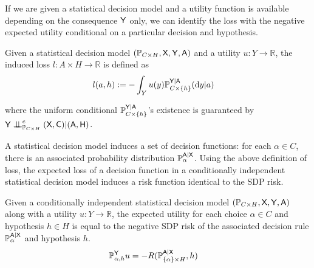 If we are given a statistical decision model and a utility function is available depending on the consequence $\mathsf{Y}$ only, we can identify the loss with the negative expected utility conditional on a particular decision and hypothesis.
\begin{definition}
Given a statistical decision model $(\mathbb{P}_{C\times H}, \mathsf{X},\mathsf{Y},\mathsf{A})$ and a utility $u:Y\to \mathbb{R}$, the induced loss $l:A\times H\to \mathbb{R}$ is defined as
\begin{align}
    l(a,h)&:= -\int_Y u(y) \mathbb{P}_{C\times\{h\}}^{\mathsf{Y}|\mathsf{A}}(\mathrm{d}y|a)
\end{align}
\end{definition}
where the uniform conditional $\mathbb{P}_{C\times\{h\}}^{\mathsf{Y}|\mathsf{A}}$'s existence is guaranteed by $\RV{Y}\CI^e_{\prob{P}_{C\times H}} (\RV{X,C})|(\RV{A},\RV{H})$.

A statistical decision model induces a set of decision functions: for each $\alpha\in C$, there is an associated probability distribution $\mathbb{P}_\alpha^{\mathsf{A}|\mathsf{X}}$. Using the above definition of loss, the expected loss of a decision function in a conditionally independent statistical decision model induces a risk function identical to the SDP risk.
\begin{theorem}\label{th:ind_risk}
Given a conditionally independent statistical decision model $(\mathbb{P}_{C\times H}, \mathsf{X},\mathsf{Y},\mathsf{A})$ along with a utility $u:Y\to \mathbb{R}$, the expected utility for each choice $\alpha\in C$ and hypothesis $h\in H$ is equal to the negative SDP risk of the associated decision rule $\mathbb{P}_\alpha^{\mathsf{A}|\mathsf{X}}$ and hypothesis $h$.
\begin{align}
    \mathbb{P}_{\alpha,h}^{\mathsf{Y}}u &= -R(\mathbb{P}_{\{\alpha\}\times H}^{\mathsf{A}|\mathsf{X}},h)
\end{align}
\end{theorem}

